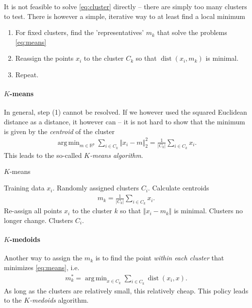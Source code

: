 \documentclass{article}
\DeclareMathOperator*{\argmin}{arg\,min}
\newcommand{\R}{\mathbb{R}}
\newcommand{\abs}[1]{\vert #1 \vert}
\newcommand{\norm}[1]{\Vert #1 \Vert}
\DeclareMathOperator{\dist}{dist}
\begin{document}
It is not feasible to solve \eqref{eq:cluster} directly -- there are simply too many clusters to test. There is however a simple, iterative way to at least find a local minimum
\begin{enumerate}
    \item For fixed clusters, find the 'representatives' $m_k$ that solve the problems \eqref{eq:means}
    \item Reassign the points $x_i$ to the cluster $C_k$ so that $\dist(x_i,m_k)$ is minimal.
    \item Repeat.
\end{enumerate}


\paragraph{$K$-means} 
In general, step (1) cannot be resolved. If we however used the squared Euclidean distance as a distance, it however can -- it is not hard to show that the minimum is given by the \emph{centroid} of the cluster
\begin{align*}
    \argmin_{m\in \R^p} \sum_{i \in C_k} \norm{x_i-m}_2^2 = \frac{1}{\abs{C_k}}\sum_{i \in C_k}x_i.
\end{align*}
This leads to the so-called \emph{$K$-means algorithm}.


\begin{algorithm}[tb]      
	\caption{$K$-means} 
	\label{alg:kmeans}
	\begin{algorithmic} [1]
 		\REQUIRE Training data $x_i$.
 		\STATE Randomly assigned clusters $C_i$.
 		\REPEAT
 			\STATE Calculate centroids
            \begin{align*}
                m_k = \frac{1}{\abs{C_k}}\sum_{i \in C_k}x_i.
            \end{align*}
            \STATE Re-assign all points $x_i$ to the cluster $k$ so that $\norm{x_i-m_k}$ is minimal.
 		\UNTIL Clusters no longer change.
 		\RETURN Clusters $C_i$.
	\end{algorithmic}
\end{algorithm}

\paragraph{$K$-medoids} Another way to assign the $m_k$ is to find the point \emph{within each cluster} that minimizes \eqref{eq:means}, i.e.
\begin{align*}
    m_k^* = \argmin_{x \in C_k} \sum_{i\in C_k} \dist(x_i,x).
\end{align*}
As long as the clusters are relatively small, this relatively cheap. This policy leads to the \emph{$K$-medoids} algorithm. 
\end{document}
